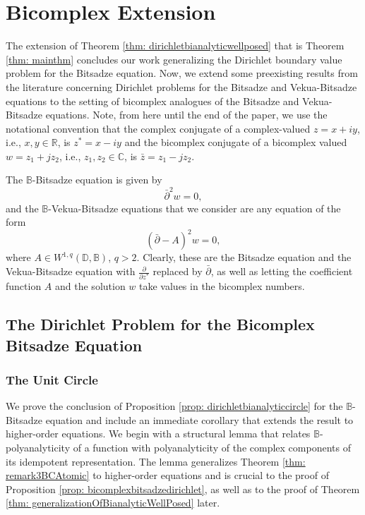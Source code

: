 \documentclass[12pt,reqno]{amsart}
\theoremstyle{definition}
\theoremstyle{remark}
\newcommand{\p}{\partial}
\newcommand{\z}{\bar z}
\newcommand{\dbar}{\bar\partial}
\newcommand{\bc}{\mathbb{B}}
\newcommand{\disk}{\mathbb{D}}
\begin{document}
    



\section{Bicomplex Extension}\label{section: BicomplexExtension}

    The extension of Theorem \ref{thm: dirichletbianalyticwellposed} that is Theorem \ref{thm: mainthm} concludes our work generalizing the Dirichlet boundary value problem for the Bitsadze equation. Now, we extend some preexisting results from the literature concerning Dirichlet problems for the Bitsadze and Vekua-Bitsadze equations to the setting of bicomplex analogues of the Bitsadze and Vekua-Bitsadze equations. Note, from here until the end of the paper, we use the notational convention that the complex conjugate of a complex-valued $z = x+iy$, i.e., $x, y \in \mathbb{R}$, is $z^* = x-iy$ and the bicomplex conjugate of a bicomplex valued $w = z_1 + j z_2$, i.e., $z_1,z_2 \in \mathbb{C}$, is $\z = z_1 - j z_2$. 

    The $\bc$-Bitsadze equation is given by
    \[
        \dbar^2 w = 0,
    \]
    and the $\bc$-Vekua-Bitsadze equations that we consider are any equation of the form 
    \[
        (\dbar - A)^2 w = 0,
    \]
    where $A \in W^{1,q}(\disk,\bc)$, $q>2$. Clearly, these are the Bitsadze equation and the Vekua-Bitsadze equation with $\frac{\p}{\p z^*}$ replaced by $\dbar$, as well as letting the coefficient function $A$ and the solution $w$ take values in the bicomplex numbers.

    \subsection{The Dirichlet Problem for the Bicomplex Bitsadze Equation}\label{section: bcdirifchletbitsadzeequation}

        

        \subsubsection{The Unit Circle}

        We prove the conclusion of Proposition \ref{prop: dirichletbianalyticcircle} for the $\bc$-Bitsadze equation and include an immediate corollary that extends the result to higher-order equations. We begin with a structural lemma that relates $\bc$-polyanalyticity of a function with polyanalyticity of the complex components of its idempotent representation. The lemma generalizes Theorem \ref{thm: remark3BCAtomic} to higher-order equations and is crucial to the proof of Proposition \ref{prop: bicomplexbitsadzedirichlet}, as well as to the proof of Theorem \ref{thm: generalizationOfBianalyticWellPosed} later.
\end{document}
